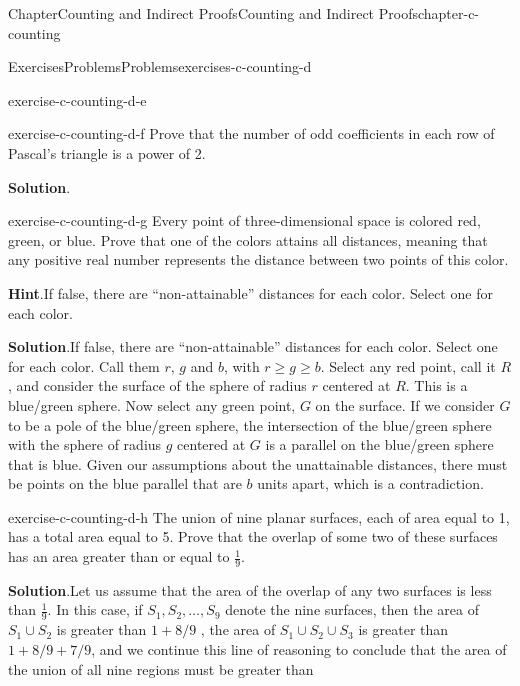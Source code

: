\documentclass[oneside,10pt,]{book}
\newcommand{\blocktitlefont}{\relax}
\numberwithin{equation}{section}
\begin{document}
\begin{chapterptx}{Chapter}{Counting and Indirect Proofs}{}{Counting and Indirect Proofs}{}{}{chapter-c-counting}
\begin{exercises-section}{Exercises}{Problems}{}{Problems}{}{}{exercises-c-counting-d}
\begin{divisionexercise}{4}{}{}{exercise-c-counting-d-e}
\end{divisionexercise}%
\begin{divisionexercise}{5}{}{}{exercise-c-counting-d-f}%
Prove that the number of odd coefficients in each row of Pascal's triangle is a power of 2.%
\par\smallskip%
\noindent\textbf{\blocktitlefont Solution}.\hypertarget{solution-c-counting-d-f-b}{}\quad{}%
\end{divisionexercise}%
\begin{divisionexercise}{6}{}{}{exercise-c-counting-d-g}%
Every point of three-dimensional space is colored red, green, or blue. Prove that one of the colors attains all distances, meaning that any positive real number represents the distance between two points of this color.%
\par\smallskip%
\noindent\textbf{\blocktitlefont Hint}.\hypertarget{hint-c-counting-d-g-b}{}\quad{}If false, there are ``non-attainable'' distances for each color. Select one for each color.%
\par\smallskip%
\noindent\textbf{\blocktitlefont Solution}.\hypertarget{solution-c-counting-d-g-c}{}\quad{}If false, there are ``non-attainable'' distances for each color. Select one for each color.  Call them \(r\), \(g\) and \(b\), with  \(r \geq g \geq b\).  Select any red point, call it \(R\), and consider the surface of the sphere of radius \(r\) centered at \(R\).   This is a blue\slash{}green sphere.   Now select any green point, \(G\) on the surface. If we consider \(G\) to be a pole of the blue\slash{}green sphere, the intersection of the blue\slash{}green sphere with the sphere of radius \(g\)  centered at \(G\) is a parallel on the blue\slash{}green sphere that is blue.  Given our assumptions about the unattainable distances, there must be points on the blue parallel that are \(b\) units apart, which is a contradiction.%
\end{divisionexercise}%
\begin{divisionexercise}{7}{}{}{exercise-c-counting-d-h}%
The union of nine planar surfaces, each of area equal to 1, has a total area equal to 5. Prove that the overlap of some two of these surfaces has an area greater than or equal to \(\frac{1}{9}\).%
\par\smallskip%
\noindent\textbf{\blocktitlefont Solution}.\hypertarget{solution-c-counting-d-h-b}{}\quad{}Let us assume that the area of the overlap of any two surfaces is less than \(\frac{1}{9}\). In this case, if \(S_1, S_2, \dots , S_9\)  denote the nine surfaces, then the area of \(S_1 \cup S_2\) is greater than \(1 + 8/9\) , the area of \(S_1 \cup S_2 \cup S_3\) is greater than \(1 + 8/9 + 7/9\), and we continue this line of reasoning to conclude that the area of the union of all nine regions must be greater than%

\end{divisionexercise}
\end{exercises-section}
\end{chapterptx}
\end{document}
